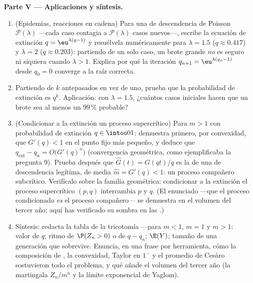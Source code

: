 \begin{problem}
\medskip
\noindent\textbf{Parte V --- Aplicaciones y síntesis.}
\begin{enumerate}[resume]
  \item (Epidemias, reacciones en cadena) Para una  de
        descendencia de Poisson $\mathcal P(\lambda)$ ---cada caso
        contagia a $\mathcal P(\lambda)$ casos nuevos---, escribe la
        ecuación de extinción $q = \eu^{\lambda(q-1)}$ y resuélvela
        numéricamente para $\lambda = 1.5$ ($q \approx 0.417$) y
        $\lambda = 2$ ($q \approx 0.203$): partiendo de un solo caso,
        un brote grande \emph{no} es seguro ni siquiera cuando
        $\lambda > 1$. Explica por qué la iteración $q_{n+1} =
        \eu^{\lambda(q_n - 1)}$ desde $q_0 = 0$ converge a la raíz
        correcta.
  \item Partiendo de $k$ antepasados en vez de uno, prueba que la
        probabilidad de extinción es $q^k$. Aplicación: con $\lambda
        = 1.5$, ¿cuántos casos iniciales hacen que un brote sea al
        menos un $99\,\%$ probable?
  \item (Condicionar a la extinción un proceso supercrítico) Para $m
        > 1$ con probabilidad de extinción $q \in \intoo01$:
        demuestra primero, por convexidad, que $G'(q) < 1$ en el
        punto fijo más pequeño, y deduce que $q_{\mathrm{ext}} - q_n
        = O\bigl(G'(q)^n\bigr)$ (convergencia geométrica, como
        ejemplificaba la pregunta 9). Prueba después que $\widehat
        G(t) = G(qt)/q$ es la  de una  de
        descendencia legítima, de media $\widehat m = G'(q) < 1$: un
        proceso compañero subcrítico. Verifícalo sobre la familia
        geométrica: condicionar a la extinción el proceso
        supercrítico $(p, q)$ intercambia $p$ y $q$. (El enunciado
         ---que el proceso condicionado \emph{es} el proceso
        compañero--- se demuestra en el volumen del tercer año; aquí
        has verificado su sombra en las .)
  \item Síntesis: redacta la tabla de la tricotomía ---para $m < 1$,
        $m = 1$ y $m > 1$: valor de $q$; ritmo de $\P(Z_n > 0)$ o de
        $q - q_n$; $\E(Y)$; tamaño de una generación que sobrevive.
        Enuncia, en una frase por herramienta, cómo la composición de
        , la convexidad, Taylor en $1^-$ y el
        promedio de Cesàro sostuvieron todo el problema, y qué añade
        el volumen del tercer año (la martingala $Z_n/m^n$ y la 
        límite exponencial de Yaglom).
\end{enumerate}
\end{problem}
